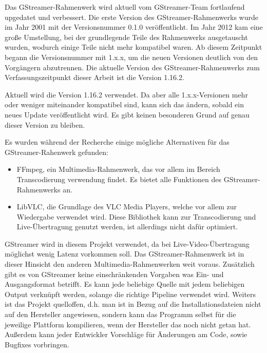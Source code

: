 Das GStreamer-Rahmenwerk wird aktuell vom GStreamer-Team fortlaufend upgedatet und verbessert.
Die erste Version des GStreamer-Rahmenwerks wurde im Jahr 2001 mit der Versionsnummer 0.1.0 veröffentlicht.
Im Jahr 2012 kam eine große Umstellung, bei der grundlegende Teile des Rahmenwerks ausgetauscht wurden, wodurch einige Teile nicht mehr kompatibel waren.
Ab diesem Zeitpunkt begann die Versionsnummer mit 1.x.x, um die neuen Versionen deutlich von den Vorgängern abzutrennen.
Die aktuelle Version des GStreamer-Rahmenwerks zum Verfassungszeitpunkt dieser Arbeit ist die Version 1.16.2.\par

Aktuell wird die Version 1.16.2 verwendet. Da aber alle 1.x.x-Versionen mehr oder weniger miteinander kompatibel sind, kann sich das ändern, sobald ein neues Update veröffentlicht wird. Es gibt keinen besonderen Grund auf genau dieser Version zu bleiben.\par

Es wurden während der Recherche einige mögliche Alternativen für das GStreamer-Rahenwerk gefunden:
\begin{itemize}
    \item FFmpeg, ein Multimedia-Rahmenwerk, das vor allem im Bereich Transcodierung verwendung findet. Es bietet alle Funktionen des GStreamer-Rahmenwerks an.
    \item LibVLC, die Grundlage des VLC Media Players, welche vor allem zur Wiedergabe verwendet wird. Diese Bibliothek kann zur Transcodierung und Live-Übertragung genutzt werden, ist allerdings nicht dafür optimiert.
\end{itemize}

GStreamer wird in diesem Projekt verwendet, da bei Live-Video-Übertragung möglichst wenig Latenz vorkommen soll.
Das GStreamer-Rahmenwerk ist in dieser Hinsicht den anderen Multimedia-Rahmenwerken weit voraus.
Zusätzlich gibt es von GStreamer keine einschränkenden Vorgaben was Ein- und Ausgangsformat betrifft.
Es kann jede beliebige Quelle mit jedem beliebigen Output verknüpft werden, solange die richtige Pipeline verwendet wird.
Weiters ist das Projekt quelloffen, d.h. man ist in Bezug auf die Installationsdateien nicht auf den Hersteller angewiesen, sondern kann das Programm selbst für die jeweilige Plattform kompilieren, wenn der Hersteller das noch nicht getan hat.
Außerdem kann jeder Entwickler Vorschläge für Änderungen am Code, sowie Bugfixes vorbringen.
